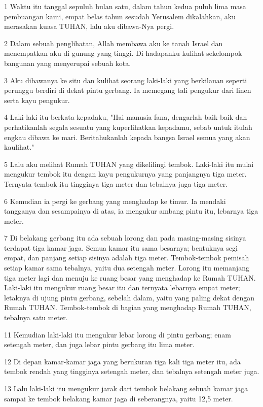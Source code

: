 \par 1 Waktu itu tanggal sepuluh bulan satu, dalam tahun kedua puluh lima masa pembuangan kami, empat belas tahun sesudah Yerusalem dikalahkan, aku merasakan kuasa TUHAN, lalu aku dibawa-Nya pergi.
\par 2 Dalam sebuah penglihatan, Allah membawa aku ke tanah Israel dan menempatkan aku di gunung yang tinggi. Di hadapanku kulihat sekelompok bangunan yang menyerupai sebuah kota.
\par 3 Aku dibawanya ke situ dan kulihat seorang laki-laki yang berkilauan seperti perunggu berdiri di dekat pintu gerbang. Ia memegang tali pengukur dari linen serta kayu pengukur.
\par 4 Laki-laki itu berkata kepadaku, "Hai manusia fana, dengarlah baik-baik dan perhatikanlah segala sesuatu yang kuperlihatkan kepadamu, sebab untuk itulah engkau dibawa ke mari. Beritahukanlah kepada bangsa Israel semua yang akan kaulihat."
\par 5 Lalu aku melihat Rumah TUHAN yang dikelilingi tembok. Laki-laki itu mulai mengukur tembok itu dengan kayu pengukurnya yang panjangnya tiga meter. Ternyata tembok itu tingginya tiga meter dan tebalnya juga tiga meter.
\par 6 Kemudian ia pergi ke gerbang yang menghadap ke timur. Ia mendaki tangganya dan sesampainya di atas, ia mengukur ambang pintu itu, lebarnya tiga meter.
\par 7 Di belakang gerbang itu ada sebuah lorong dan pada masing-masing sisinya terdapat tiga kamar jaga. Semua kamar itu sama besarnya; bentuknya segi empat, dan panjang setiap sisinya adalah tiga meter. Tembok-tembok pemisah setiap kamar sama tebalnya, yaitu dua setengah meter. Lorong itu memanjang tiga meter lagi dan menuju ke ruang besar yang menghadap ke Rumah TUHAN. Laki-laki itu mengukur ruang besar itu dan ternyata lebarnya empat meter; letaknya di ujung pintu gerbang, sebelah dalam, yaitu yang paling dekat dengan Rumah TUHAN. Tembok-tembok di bagian yang menghadap Rumah TUHAN, tebalnya satu meter.
\par 11 Kemudian laki-laki itu mengukur lebar lorong di pintu gerbang; enam setengah meter, dan juga lebar pintu gerbang itu lima meter.
\par 12 Di depan kamar-kamar jaga yang berukuran tiga kali tiga meter itu, ada tembok rendah yang tingginya setengah meter, dan tebalnya setengah meter juga.
\par 13 Lalu laki-laki itu mengukur jarak dari tembok belakang sebuah kamar jaga sampai ke tembok belakang kamar jaga di seberangnya, yaitu 12,5 meter.
